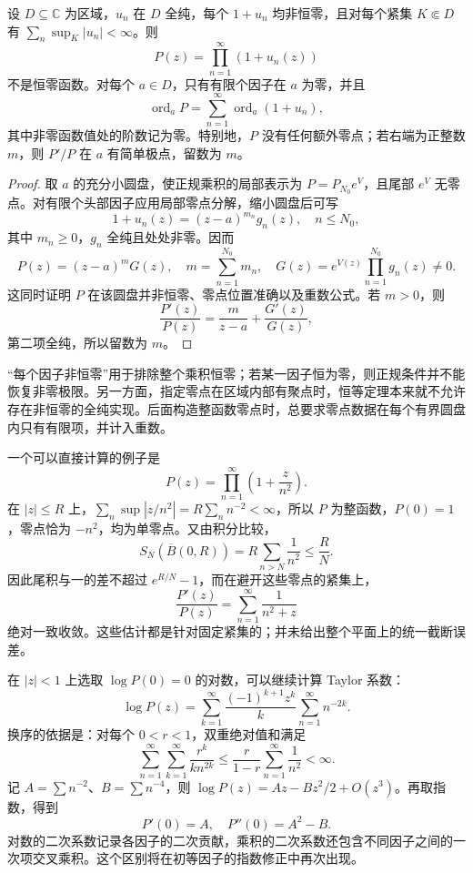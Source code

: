 \begin{proposition}[零点与准确重数]\label{b3:prop:20-product-zero-orders}
设 \(D\subseteq\mathbb C\) 为区域，\(u_n\) 在 \(D\) 全纯，每个 \(1+u_n\) 均非恒零，且对每个紧集 \(K\Subset D\) 有 \(\sum_n\sup_K|u_n|<\infty\)。则
\[
 P(z)=\prod_{n=1}^{\infty}(1+u_n(z))
\]
不是恒零函数。对每个 \(a\in D\)，只有有限个因子在 \(a\) 为零，并且
\[
 \operatorname{ord}_aP
 =\sum_{n=1}^{\infty}\operatorname{ord}_a(1+u_n),
\]
其中非零函数值处的阶数记为零。特别地，\(P\) 没有任何额外零点；若右端为正整数 \(m\)，则 \(P'/P\) 在 \(a\) 有简单极点，留数为 \(m\)。
\end{proposition}
\begin{proof}
取 \(a\) 的充分小圆盘，使正规乘积的局部表示为 \(P=P_{N_0}e^V\)，且尾部 \(e^V\) 无零点。对有限个头部因子应用局部零点分解，缩小圆盘后可写
\[
 1+u_n(z)=(z-a)^{m_n}g_n(z),\quad n\le N_0,
\]
其中 \(m_n\ge0\)，\(g_n\) 全纯且处处非零。因而
\[
 P(z)=(z-a)^mG(z),\quad
 m=\sum_{n=1}^{N_0}m_n,\quad
 G(z)=e^{V(z)}\prod_{n=1}^{N_0}g_n(z)\ne0.
\]
这同时证明 \(P\) 在该圆盘并非恒零、零点位置准确以及重数公式。若 \(m>0\)，则
\[
 \frac{P'(z)}{P(z)}=\frac{m}{z-a}+\frac{G'(z)}{G(z)},
\]
第二项全纯，所以留数为 \(m\)。
\end{proof}
“每个因子非恒零”用于排除整个乘积恒零；若某一因子恒为零，则正规条件并不能恢复非零极限。另一方面，指定零点在区域内部有聚点时，恒等定理本来就不允许存在非恒零的全纯实现。后面构造整函数零点时，总要求零点数据在每个有界圆盘内只有有限项，并计入重数。

\ProseParagraphBreak

一个可以直接计算的例子是
\[
 P(z)=\prod_{n=1}^{\infty}\left(1+\frac{z}{n^2}\right).
\]
在 \(|z|\le R\) 上，\(\sum_n\sup|z/n^2|=R\sum_n n^{-2}<\infty\)，所以 \(P\) 为整函数，\(P(0)=1\)，零点恰为 \(-n^2\)，均为单零点。又由积分比较，
\[
 S_N(\overline B(0,R))
 =R\sum_{n>N}\frac1{n^2}\le\frac RN.
\]
因此尾积与一的差不超过 \(e^{R/N}-1\)，而在避开这些零点的紧集上，
\[
 \frac{P'(z)}{P(z)}=\sum_{n=1}^{\infty}\frac1{n^2+z}
\]
绝对一致收敛。这些估计都是针对固定紧集的；并未给出整个平面上的统一截断误差。

\ProseParagraphBreak

在 \(|z|<1\) 上选取 \(\log P(0)=0\) 的对数，可以继续计算 Taylor 系数：
\[
 \log P(z)=\sum_{k=1}^{\infty}
 \frac{(-1)^{k+1}z^k}{k}\sum_{n=1}^{\infty}n^{-2k}.
\]
换序的依据是：对每个 \(0<r<1\)，双重绝对值和满足
\[
 \sum_{n=1}^{\infty}\sum_{k=1}^{\infty}
 \frac{r^k}{k n^{2k}}
 \le\frac r{1-r}\sum_{n=1}^{\infty}\frac1{n^2}<\infty.
\]
记 \(A=\sum n^{-2}\)、\(B=\sum n^{-4}\)，则 \(\log P(z)=Az-Bz^2/2+O(z^3)\)。再取指数，得到
\[
 P'(0)=A,\quad P''(0)=A^2-B.
\]
对数的二次系数记录各因子的二次贡献，乘积的二次系数还包含不同因子之间的一次项交叉乘积。这个区别将在初等因子的指数修正中再次出现。
